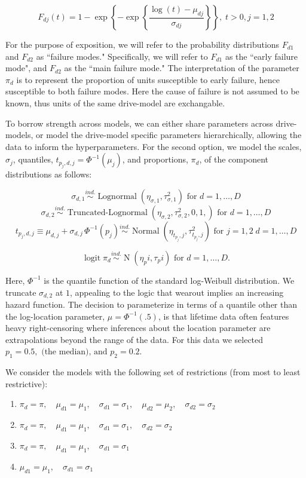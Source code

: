 \documentclass[12pt]{article}
\newcommand{\ind}{\stackrel{ind.}{\sim}}
\newcommand{\op}{\operatorname}
\begin{document}
$$F_{dj}(t) = 1 - \exp \left\{ -\exp \left\{ \frac{ \log (t) - \mu_{dj}}{\sigma_{dj}} \right\} \right\},\; t>0, j=1,2$$

For the purpose of exposition, we will refer to the probability distributions $F_{d1}$ and $F_{d2}$ as ``failure modes." Specifically, we will refer to $F_{d1}$ as the ``early failure mode", and $F_{d2}$ as the ``main failure mode." The interpretation of the parameter $\pi_d$ is to represent the proportion of units susceptible to early failure, hence susceptible to both failure modes. Here the cause of failure is not assumed to be known, thus units of the same drive-model are exchangable.

To borrow strength across models, we can either share parameters across drive-models, or model the drive-model specific parameters hierarchically, allowing the data to inform the hyperparameters. For the second option, we model the scales, $\sigma_j$, quantiles, $t_{p_j,d,j} = \Phi^{-1}(\mu_j)$, and proportions, $\pi_d$, of the component distributions as follows:

$$\sigma_{d,1} \ind \op{Lognormal} \left( \eta_{\sigma,1}, \tau^2_{\sigma,1} \right) \mbox{ for } d=1,\ldots,D$$
$$\sigma_{d,2} \ind \op{Truncated-Lognormal} \left( \eta_{\sigma,2}, \tau^2_{\sigma,2} , 0, 1, \right) \mbox{ for } d=1,\ldots,D$$
$$t_{p_j,d,j} \equiv \mu_{d,j} + \sigma_{d,j}\,\Phi^{-1}(p_j)  \ind \op{Normal} \left(\eta_{t_{p_j},j}, \tau^2_{t_{p_j},j}\right) \mbox{ for } j=1,2\; d=1,\ldots,D$$

$$\op{logit} \pi_d \ind \op{N}(\eta_pi, \tau_pi) \mbox{ for } d=1,\ldots,D.$$

Here, $\Phi^{-1}$ is the quantile function of the standard log-Weibull distribution. We truncate $\sigma_{d,2}$ at $1$, appealing to the logic that wearout implies an increasing hazard function. The decision to parameterize in terms of a quantile other than the log-location parameter, $\mu = \Phi^{-1}(.5)$, is that lifetime data often features heavy right-censoring where inferences about the location parameter are extrapolations beyond the range of the data. For this data we selected $p_1=0.5,\mbox{ (the median), and } p_2 = 0.2$.

We consider the models with the following set of restrictions (from most to least restrictive):

\begin{enumerate}
\item $\pi_{d} = \pi,\quad \mu_{d1} = \mu_1,\quad \sigma_{d1}=\sigma_1,\quad \mu_{d2} = \mu_2,\quad \sigma_{d2} = \sigma_2$
\item $\pi_{d} = \pi,\quad \mu_{d1} = \mu_1,\quad \sigma_{d1}=\sigma_1,\quad \sigma_{d2} = \sigma_2$
\item $\pi_{d} = \pi,\quad \mu_{d1} = \mu_1,\quad \sigma_{d1}=\sigma_1$
\item $\mu_{d1} = \mu_1,\quad \sigma_{d1}=\sigma_1$
\end{enumerate}
\end{document}
